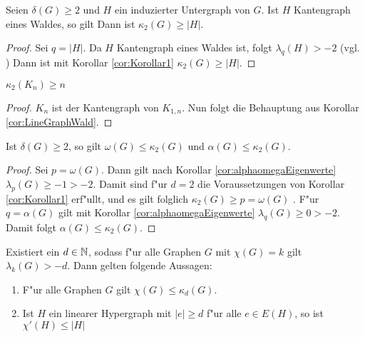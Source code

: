 \begin{corollary}
  \label{cor:LineGraphWald}
  Seien $\delta(G) \geq 2$ und $H$ ein induzierter Untergraph von $G$. Ist $H$ Kantengraph eines Waldes, so gilt 
  Dann ist $\kappa_{2}(G)\geq \left|H\right|$.
\end{corollary}

\begin{proof}
  Sei $q = |H|$. Da $H$ Kantengraph eines Waldes ist, folgt $\lambda_{q}(H) > -2$ (vgl. \cite[3.4.10]{zbMATH05625877}) 
  Dann ist mit Korollar \ref{cor:Korollar1} $\kappa_{2}\left( G \right) \geq \left| H\right|$.
\end{proof}

\begin{corollary}[Klotz]
  $\kappa_{2}\left( K_n \right) \geq n$
\end{corollary}

\begin{proof}
  $K_n$ ist der Kantengraph von $K_{1,n}$. Nun folgt die Behauptung aus Korollar \ref{cor:LineGraphWald}.
\end{proof}
\begin{corollary}
  Ist $\delta\left( G \right) \geq 2$, so gilt $\omega\left( G \right)\leq \kappa_{2}\left( G \right)$ und $\alpha\left( G \right)\leq \kappa_{2}\left( G \right)$.
  \label{cor:alphaomegakrausz}
\end{corollary}

\begin{proof}
  Sei $p = \omega(G)$. Dann gilt nach Korollar \ref{cor:alphaomegaEigenwerte} $\lambda_{p}\left( G \right)\geq -1 > -2$. Damit sind f"ur $d=2$ die Voraussetzungen von Korollar \ref{cor:Korollar1} erf"ullt, und es gilt folglich $\kappa_{2}\left( G \right)\geq p = \omega\left( G \right)$ .
  F"ur $q=\alpha\left( G \right)$ gilt mit Korollar \ref{cor:alphaomegaEigenwerte} $\lambda_{q}\left( G \right)\geq 0 > -2$. Damit folgt $\alpha\left( G \right) \leq \kappa_{2}\left( G \right)$.
\end{proof}

\begin{theorem}
  \label{thm:MainTheorem}
  Existiert ein $d\in {\mathbb{N}}$, sodass f"ur alle  Graphen $G$ mit $\chi(G) = k $ gilt $ \lambda_{k}(G) > -d$. Dann gelten folgende Aussagen:
  \begin{enumerate}[label=(\alph*)]
    \item F"ur alle Graphen $G$ gilt $\chi(G) \leq \kappa_d (G)$.
    \item  Ist $H$ ein linearer Hypergraph mit $\left|e\right| \geq d$ f"ur alle $e\in E(H)$, so ist $\chi'\left( H \right)\leq \left|H\right| $
  \end{enumerate}
\end{theorem}

